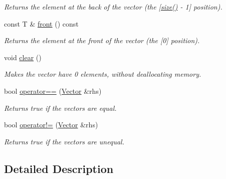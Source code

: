 \begin{DoxyCompactItemize}
\begin{DoxyCompactList}\small\item\em Returns the element at the back of the vector (the \mbox{[}\hyperlink{classsc_1_1Vector_a2ccab0421fad94601e6bd5e344aa3340}{size()} -\/ 1\mbox{]} position). \end{DoxyCompactList}\item 
\mbox{\label{classsc_1_1Vector_a6bcf8585249bdcad59a45709c817dd18}} 
const T \& \hyperlink{classsc_1_1Vector_a6bcf8585249bdcad59a45709c817dd18}{front} () const
\begin{DoxyCompactList}\small\item\em Returns the element at the front of the vector (the \mbox{[}0\mbox{]} position). \end{DoxyCompactList}\item 
\mbox{\label{classsc_1_1Vector_a312f07c5f7a6fdf16c2f88d24ed2a95f}} 
void \hyperlink{classsc_1_1Vector_a312f07c5f7a6fdf16c2f88d24ed2a95f}{clear} ()
\begin{DoxyCompactList}\small\item\em Makes the vector have 0 elements, without deallocating memory. \end{DoxyCompactList}\item 
\mbox{\label{classsc_1_1Vector_acc2772115b77323077d40ade3acf6c26}} 
bool \hyperlink{classsc_1_1Vector_acc2772115b77323077d40ade3acf6c26}{operator==} (\hyperlink{classsc_1_1Vector}{Vector} \&rhs)
\begin{DoxyCompactList}\small\item\em Returns true if the vectors are equal. \end{DoxyCompactList}\item 
\mbox{\label{classsc_1_1Vector_a6456296abc5b13a763e0f1938e17dae7}} 
bool \hyperlink{classsc_1_1Vector_a6456296abc5b13a763e0f1938e17dae7}{operator!=} (\hyperlink{classsc_1_1Vector}{Vector} \&rhs)
\begin{DoxyCompactList}\small\item\em Returns true if the vectors are unequal. \end{DoxyCompactList}\end{DoxyCompactItemize}


\subsection{Detailed Description}

